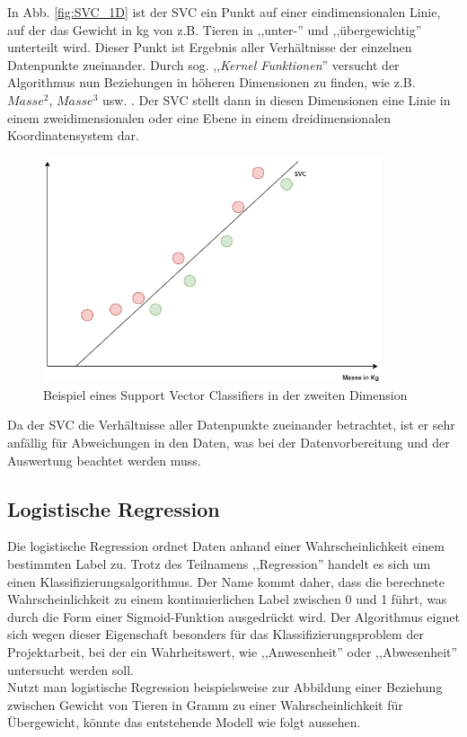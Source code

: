 In Abb. \ref{fig:SVC_1D} ist der SVC ein Punkt auf einer eindimensionalen Linie, auf der das Gewicht in kg von z.B. 
Tieren in ,,unter-'' und ,,übergewichtig'' unterteilt wird. Dieser Punkt ist Ergebnis aller Verhältnisse der einzelnen
Datenpunkte zueinander. Durch sog. ,,\textit{Kernel Funktionen}'' versucht der Algorithmus nun Beziehungen 
in höheren Dimensionen zu finden, wie z.B. $Masse^2$, $Masse^3$ usw. . Der SVC stellt dann in diesen Dimensionen 
eine Linie in einem zweidimensionalen oder eine Ebene in einem dreidimensionalen Koordinatensystem dar.\\

\begin{figure}[h]
    \centering
    \includegraphics[width=10.0cm]{pic/SVC_2D.png}
    \caption{Beispiel eines Support Vector Classifiers in der zweiten Dimension}
    \label{fig:SVC_2D}
\end{figure}

Da der SVC die Verhältnisse aller Datenpunkte zueinander betrachtet, ist er sehr anfällig für Abweichungen in 
den Daten, was bei der Datenvorbereitung und der Auswertung beachtet werden muss.

\newpage
\subsection{Logistische Regression}

Die logistische Regression ordnet Daten anhand einer Wahrscheinlichkeit einem bestimmten Label  zu. Trotz des Teilnamens
,,Regression'' handelt es sich um einen Klassifizierungsalgorithmus. Der Name kommt daher, dass die berechnete Wahrscheinlichkeit
zu einem kontinuierlichen Label zwischen 0 und 1 führt, was durch die Form einer Sigmoid-Funktion ausgedrückt wird.
Der Algorithmus eignet sich wegen dieser Eigenschaft besonders für  das Klassifizierungsproblem der Projektarbeit, 
bei der ein Wahrheitswert, wie ,,Anwesenheit'' oder ,,Abwesenheit'' untersucht werden soll.\\
Nutzt man logistische Regression beispielsweise zur Abbildung einer Beziehung zwischen Gewicht von Tieren in Gramm 
zu einer Wahrscheinlichkeit für Übergewicht, könnte das entstehende Modell wie folgt aussehen.

